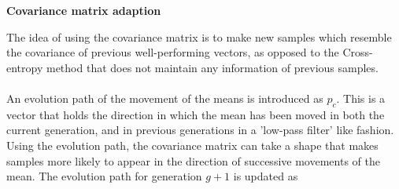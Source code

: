 \textbf{Covariance matrix adaption}

The idea of using the covariance matrix is to make new samples which
resemble the covariance of previous well-performing vectors, as opposed 
to the Cross-entropy method that does not maintain any information of
previous samples.\\
\\
An evolution path of the movement of the means is introduced as $p_{c}$. This 
is a vector that holds the direction in which the mean has been moved in 
both the current generation, and in previous generations in 
a 'low-pass filter' like fashion. Using the 
evolution path, the covariance matrix can take a shape that 
makes samples more likely to appear in the direction of successive 
movements of the mean.
The evolution path for generation $g+1$ is updated as



